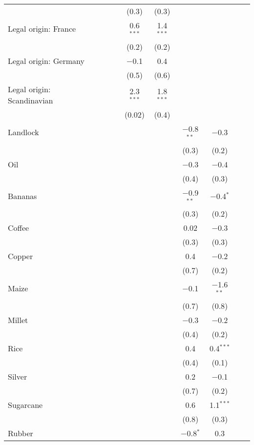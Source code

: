 {\begin{table}[]
\begin{threeparttable}
\begin{tabular}{@{\extracolsep{0pt}}lcccccccccc}
  &  &  &  &  & (0.3) & (0.3) &  &  &  &  \\ 
  Legal origin: France &  &  &  &  & 0.6$^{***}$ & 1.4$^{***}$ &  &  &  &  \\ 
  &  &  &  &  & (0.2) & (0.2) &  &  &  &  \\ 
  Legal origin: Germany &  &  &  &  & $-$0.1 & 0.4 &  &  &  &  \\ 
  &  &  &  &  & (0.5) & (0.6) &  &  &  &  \\ 
  Legal origin: Scandinavian &  &  &  &  & 2.3$^{***}$ & 1.8$^{***}$ &  &  &  &  \\ 
  &  &  &  &  & (0.02) & (0.4) &  &  &  &  \\ 
  Landlock &  &  &  &  &  &  & $-$0.8$^{**}$ & $-$0.3 &  &  \\ 
  &  &  &  &  &  &  & (0.3) & (0.2) &  &  \\ 
  Oil &  &  &  &  &  &  & $-$0.3 & $-$0.4 &  &  \\ 
  &  &  &  &  &  &  & (0.4) & (0.3) &  &  \\ 
  Bananas &  &  &  &  &  &  & $-$0.9$^{**}$ & $-$0.4$^{*}$ &  &  \\ 
  &  &  &  &  &  &  & (0.3) & (0.2) &  &  \\ 
  Coffee &  &  &  &  &  &  & 0.02 & $-$0.3 &  &  \\ 
  &  &  &  &  &  &  & (0.3) & (0.3) &  &  \\ 
  Copper &  &  &  &  &  &  & 0.4 & $-$0.2 &  &  \\ 
  &  &  &  &  &  &  & (0.7) & (0.2) &  &  \\ 
  Maize &  &  &  &  &  &  & $-$0.1 & $-$1.6$^{**}$ &  &  \\ 
  &  &  &  &  &  &  & (0.7) & (0.8) &  &  \\ 
  Millet &  &  &  &  &  &  & $-$0.3 & $-$0.2 &  &  \\ 
  &  &  &  &  &  &  & (0.4) & (0.2) &  &  \\ 
  Rice &  &  &  &  &  &  & 0.4 & 0.4$^{***}$ &  &  \\ 
  &  &  &  &  &  &  & (0.4) & (0.1) &  &  \\ 
  Silver &  &  &  &  &  &  & 0.2 & $-$0.1 &  &  \\ 
  &  &  &  &  &  &  & (0.7) & (0.2) &  &  \\ 
  Sugarcane &  &  &  &  &  &  & 0.6 & 1.1$^{***}$ &  &  \\ 
  &  &  &  &  &  &  & (0.8) & (0.3) &  &  \\ 
  Rubber &  &  &  &  &  &  & $-$0.8$^{*}$ & 0.3 &  &  \\ 

\end{tabular}
\end{threeparttable}
\end{table}}
